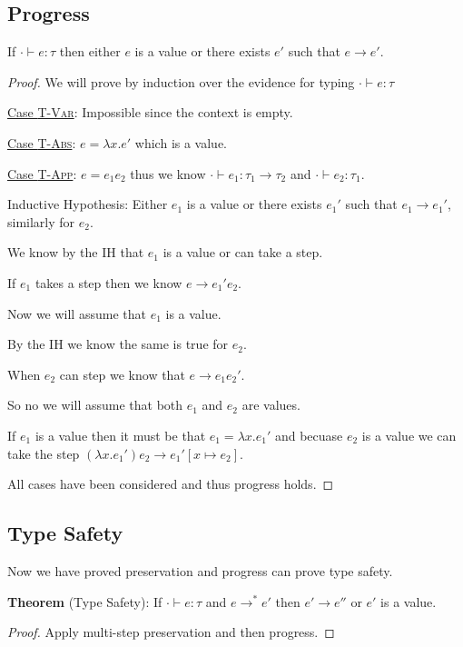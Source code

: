 \documentclass{lecturenotes}
\newenvironment{theorem}[2][Theorem]{\begin{trivlist}
\item[\hskip \labelsep {\bfseries #1}\hskip \labelsep {\bfseries #2.}]}{\end{trivlist}}
\begin{document}
\subsection{Progress}

\begin{theorem}{Progress}
  If $\cdot \vdash e : \tau$ then either $e$ is a value or there exists $e'$ such that $e \rightarrow e'$. 
\end{theorem}

\begin{proof}
  We will prove by induction over the evidence for typing $\cdot \vdash e : \tau$

  \underline{Case \textsc{T-Var}}: Impossible since the context is empty.

  \underline{Case \textsc{T-Abs}}: $e = \lambda x.e'$ which is a value. 

  \underline{Case \textsc{T-App}}: $e = e_1e_2$ thus we know $\cdot \vdash e_1 : \tau_1 \rightarrow \tau_2$ and $\cdot \vdash e_2 : \tau_1$.

    Inductive Hypothesis: Either $e_1$ is a value or there exists $e_1'$ such that $e_1 \rightarrow e_1'$, similarly for $e_2$. 

    We know by the IH that $e_1$ is a value or can take a step. 
  
    If $e_1$ takes a step then we know $e \rightarrow e_1'e_2$. 

    Now we will assume that $e_1$ is a value. 

    By the IH we know the same is true for $e_2$. 

    When $e_2$ can step we know that $e \rightarrow e_1e_2'$.

    So no we will assume that both $e_1$ and $e_2$ are values. 

    If $e_1$ is a value then it must be that $e_1 = \lambda x. e_1'$ and becuase $e_2$ is a value we can take the step  $(\lambda x. e_1')e_2 \rightarrow e_1' [x \mapsto e_2]$. 

    All cases have been considered and thus progress holds.
\end{proof}

\subsection{Type Safety}

Now we have proved preservation and progress can prove type safety. 


\begin{theorem}{Type System}
  \textbf{Theorem} (Type Safety): If $\cdot \vdash e : \tau $ and $e \rightarrow^* e'$ then $e' \rightarrow e''$ or $e'$ is a value.
\end{theorem} 

\begin{proof}
  Apply multi-step preservation and then progress.   
\end{proof}
\end{document}
